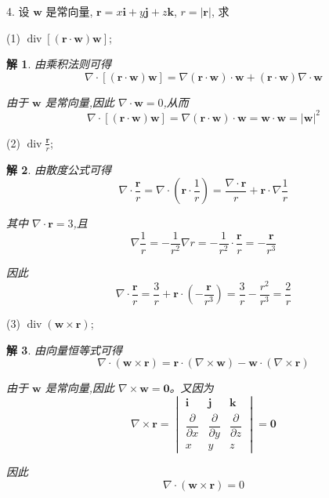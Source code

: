 \documentclass[a4paper,12pt]{article}
\newtheorem*{sol}{解}
\begin{document}
4. 设 $\boldsymbol{w}$ 是常向量, $\boldsymbol{r} = x\boldsymbol{i} + y\boldsymbol{j} + z\boldsymbol{k}$, $r = |\boldsymbol{r}|$, 求

(1) $\operatorname{div}\left[(\boldsymbol{r} \cdot \boldsymbol{w})\boldsymbol{w}\right]$;
\begin{sol}
    由乘积法则可得
    $$\nabla\cdot[(\boldsymbol{r}\cdot \boldsymbol{w})\boldsymbol{w}]=\nabla(\boldsymbol{r}\cdot \boldsymbol{w})\cdot \boldsymbol{w}+(\boldsymbol{r}\cdot \boldsymbol{w})\nabla\cdot \boldsymbol{w}$$

    由于 $\boldsymbol{w}$ 是常向量,因此 $\nabla\cdot \boldsymbol{w}=0$,从而
    $$\nabla\cdot[(\boldsymbol{r}\cdot \boldsymbol{w})\boldsymbol{w}]=\nabla(\boldsymbol{r}\cdot \boldsymbol{w})\cdot \boldsymbol{w}=\boldsymbol{w}\cdot \boldsymbol{w}=|\boldsymbol{w}|^2$$
\end{sol}

(2) $\operatorname{div} \frac{\boldsymbol{r}}{r}$;
\begin{sol}
    由散度公式可得
    $$\nabla\cdot\dfrac{\boldsymbol{r}}{r}=\nabla\cdot\left(\boldsymbol{r}\cdot\dfrac{1}{r}\right)=\dfrac{\nabla\cdot\boldsymbol{r}}{r}+\boldsymbol{r}\cdot\nabla\dfrac{1}{r}$$

    其中 $\nabla\cdot\boldsymbol{r}=3$,且
    $$\nabla\dfrac{1}{r}=-\dfrac{1}{r^2}\nabla r=-\dfrac{1}{r^2}\cdot\dfrac{\boldsymbol{r}}{r}=-\dfrac{\boldsymbol{r}}{r^3}$$

    因此
    $$\nabla\cdot\dfrac{\boldsymbol{r}}{r}=\dfrac{3}{r}+\boldsymbol{r}\cdot\left(-\dfrac{\boldsymbol{r}}{r^3}\right)=\dfrac{3}{r}-\dfrac{r^2}{r^3}=\dfrac{2}{r}$$
\end{sol}

(3) $\operatorname{div} \left(\boldsymbol{w} \times \boldsymbol{r}\right)$;
\begin{sol}
    由向量恒等式可得
    $$\nabla\cdot(\boldsymbol{w}\times \boldsymbol{r})=\boldsymbol{r}\cdot(\nabla\times \boldsymbol{w})-\boldsymbol{w}\cdot(\nabla\times \boldsymbol{r})$$

    由于 $\boldsymbol{w}$ 是常向量,因此 $\nabla\times \boldsymbol{w}=\boldsymbol{0}$。又因为
    $$\nabla\times \boldsymbol{r}=\begin{vmatrix}
            \boldsymbol{i} & \boldsymbol{j} & \boldsymbol{k} \\
            \dfrac{\partial}{\partial x} & \dfrac{\partial}{\partial y} & \dfrac{\partial}{\partial z} \\
            x & y & z
        \end{vmatrix}=\boldsymbol{0}$$

    因此
    $$\nabla\cdot(\boldsymbol{w}\times \boldsymbol{r})=0$$
\end{sol}
\end{document}
